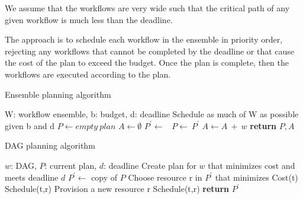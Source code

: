 \documentclass{sig-alternate}
\begin{document}
We assume that the workflows are very wide such that the critical path of any given workflow is much less than the deadline.

The approach is to schedule each workflow in the ensemble in priority order, rejecting any workflows that cannot be completed by the deadline or that cause the cost of the plan to exceed the budget. Once the plan is complete, then the workflows are executed according to the plan.

\begin{algorithm}
\caption{Ensemble planning algorithm}
\label{alg:admit}
\begin{algorithmic}[1]
\Require W: workflow ensemble, b: budget, d: deadline
\Ensure Schedule as much of W as possible given b and d
    \State $P\gets empty\ plan$
    \State $A\gets \emptyset$ 
        \State $P^\prime \gets$\ 
                \State $P\gets\ P^\prime$ 
                \State $A \gets A\ +\ w$ 
            \EndIf
        \EndIf
    \EndFor
    \State \textbf{return} $P,A$
\EndProcedure
\end{algorithmic} 
\end{algorithm}


\begin{algorithm}
\caption{DAG planning algorithm}
\label{alg:plandag}
\begin{algorithmic}[1]
\Require $w$: DAG, $P$: current plan, $d$: deadline
\Ensure Create plan for $w$ that minimizes cost and meets deadline $d$
    \State $P^\prime\gets$ copy of $P$
    \State {}
        \State Choose resource r in $P^\prime$ that minimizes Cost(t)
            \State Schedule(t,r)
        \Else
            \State Provision a new resource r
            \State Schedule(t,r)
        \EndIf
    \EndFor
    \State \textbf{return} $P^\prime$
\EndProcedure
\end{algorithmic} 
\end{algorithm}
\end{document}
